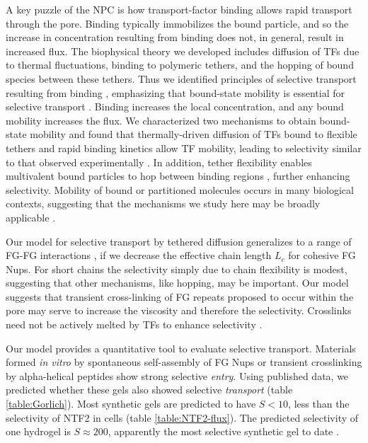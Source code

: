 A key puzzle of the NPC is how transport-factor binding allows rapid
transport through the pore.  Binding typically immobilizes the bound
particle, and so the increase in concentration resulting from binding
does not, in general, result in increased flux. The biophysical theory
we developed includes diffusion of TFs due to thermal fluctuations,
binding to polymeric tethers, and the hopping of bound species between
these tethers.  Thus we identified principles of selective transport
resulting from binding , emphasizing that
bound-state mobility is essential for selective transport
.  Binding increases the local concentration,
and any bound mobility increases the flux.  We characterized two
mechanisms to obtain bound-state mobility and found that
thermally-driven diffusion of TFs bound to flexible tethers and rapid
binding kinetics \cite{hough15, milles15} allow TF mobility, leading
to selectivity similar to that observed experimentally
.  In addition, tether flexibility enables
multivalent bound particles to hop between binding regions
 \cite{lowe15, schoch12}, further enhancing
selectivity. Mobility of bound or partitioned molecules occurs in many
biological contexts, suggesting that the mechanisms we study here may
be broadly applicable \cite{stefferson17, braga07}.


Our model for selective transport by tethered diffusion generalizes to
a range of FG-FG interactions \cite{vovk16}, if we decrease the
effective chain length $L_c$ for cohesive FG Nups.  For short chains
the selectivity simply due to chain flexibility is modest, suggesting
that other mechanisms, like hopping, may be important.  Our model
suggests that transient cross-linking of FG repeats proposed to occur
within the pore may serve to increase the viscosity and therefore the
selectivity. Crosslinks need not be actively melted by TFs to enhance
selectivity .
  
Our model provides a quantitative tool to evaluate selective
transport. Materials formed \textit{in vitro} by spontaneous
self-assembly of FG Nups \cite{frey07} or transient crosslinking by
alpha-helical peptides \cite{kim15} show strong selective
\textit{entry}.  Using published data, we predicted whether these gels
also showed selective \textit{transport} (table \ref{table:Gorlich}).
Most synthetic gels are predicted to have $S<10$, less than the
selectivity of NTF2 in cells (table \ref{table:NTF2-flux}). The
predicted selectivity of one hydrogel is $S\approx200$, apparently the
most selective synthetic gel to date \cite{frey07}.


